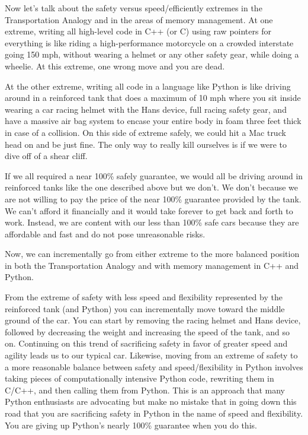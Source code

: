 \documentclass[pdf,ps2pdf,11pt]{SANDreport}
\begin{document}
Now let's talk about the safety versus speed/efficiently extremes in
the Transportation Analogy and in the areas of memory management.  At
one extreme, writing all high-level code in C++ (or C) using raw
pointers for everything is like riding a high-performance motorcycle
on a crowded interstate going 150 mph, without wearing a helmet or
any other safety gear, while doing a wheelie.  At this extreme, one
wrong move and you are dead.

At the other extreme, writing all code in a language like Python is
like driving around in a reinforced tank that does a maximum of 10
mph where you sit inside wearing a car racing helmet with the Hans
device, full racing safety gear, and have a massive air bag system to
encase your entire body in foam three feet thick in case of a
collision.  On this side of extreme safely, we could hit a Mac truck
head on and be just fine.  The only way to really kill ourselves is if
we were to dive off of a shear cliff.

If we all required a near 100\% safely guarantee, we would all be
driving around in reinforced tanks like the one described above but we
don't.  We don't because we are not willing to pay the price of the
near 100\% guarantee provided by the tank.  We can't afford it
financially and it would take forever to get back and forth to
work. Instead, we are content with our less than 100\% safe cars
because they are affordable and fast and do not pose unreasonable
risks.

Now, we can incrementally go from either extreme to the more balanced
position in both the Transportation Analogy and with memory management
in C++ and Python.

From the extreme of safety with less speed and flexibility represented
by the reinforced tank (and Python) you can incrementally move toward
the middle ground of the car. You can start by removing the racing
helmet and Hans device, followed by decreasing the weight and
increasing the speed of the tank, and so on.  Continuing on this trend
of sacrificing safety in favor of greater speed and agility leads us
to our typical car.  Likewise, moving from an extreme of safety to a
more reasonable balance between safety and speed/flexibility in Python
involves taking pieces of computationally intensive Python code,
rewriting them in C/C++, and then calling them from Python.  This is
an approach that many Python enthusiasts are advocating
{}\cite{PythonForSCPerforamnce08} but make no mistake that in going
down this road that you are sacrificing safety in Python in the name
of speed and flexibility.  You are giving up Python's nearly 100\%
guarantee when you do this.
\end{document}
